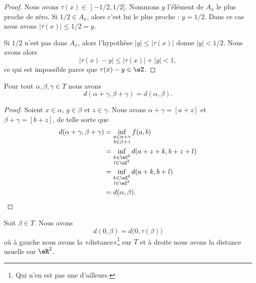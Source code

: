 \begin{proof}
	Nous avons \( \tau(x)\in\mathopen] -1/2,1/2\mathclose]\). Nommons \( y\) l'élément de \( A_x\) le plus proche de zéro. Si \( 1/2\in A_x\), alors c'est lui le plus proche : \( y=1/2\). Dans ce cas nous avons \( | \tau(x) |\leq 1/2=y\).

	Si \( 1/2\) n'est pas dans \( A_x\), alors l'hypothèse \( | y |\leq | \tau(x) |\) donne \( | y |<1/2\). Nous avons alors
	\begin{equation}
		| \tau(x)-y |\leq | \tau(x) |+| y |<1,
	\end{equation}
	ce qui est impossible parce que \( \tau(x)-y\in \eZ\).
\end{proof}

\begin{lemma}	\label{LEMooQAQPooGGumSe}
	Pour tout \( \alpha,\beta, \gamma\in T\) nous avons
	\begin{equation}
		d(\alpha+\gamma,\beta+\gamma)=d(\alpha,\beta).
	\end{equation}
\end{lemma}

\begin{proof}
	Soient \( x\in \alpha\), \( y\in \beta\) et \( z\in \gamma\). Nous avons \( \alpha+\gamma=[a+z]\) et \( \beta+\gamma=[b+z]\), de telle sorte que
	\begin{subequations}
		\begin{align}
			d(\alpha+\gamma,\beta+\gamma) & =\inf_{\substack{ a\in\alpha+\gamma \\ b\in \beta+\gamma }  }f(a,b)\\
			                              & =\inf_{\substack{ k\in \eZ^2        \\ l\in \eZ^2 }  }d(a+z+k,b+z+l)\\
			                              & =\inf_{\substack{ k\in \eZ^2        \\ l\in \eZ^2 }  }d(a+k,b+l)\\
			                              & =d(\alpha,\beta).
		\end{align}
	\end{subequations}
\end{proof}

\begin{lemma}	\label{LEMooQNDHooFXYjtj}
	Soit \( \beta\in T\). Nous avons
	\begin{equation}
		d(0,\beta)=d\big( 0,\tau(\beta) \big)
	\end{equation}
	où à gauche nous avons la «distance»\footnote{Qui n'en est pas une d'ailleurs.} sur \( T\) et à droite nous avons la distance usuelle sur \( \eR^2\).
\end{lemma}

